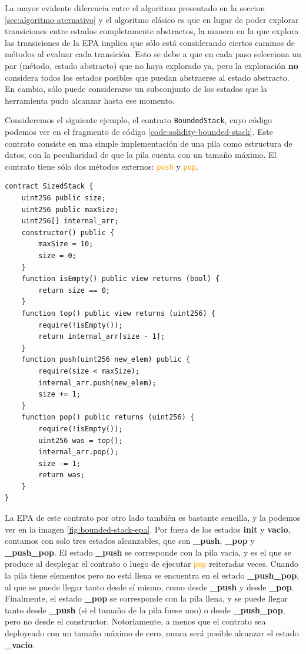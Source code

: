 La mayor evidente diferencia entre el algoritmo presentado en la seccion \ref{sec:algoritmo-aternativo} y el algoritmo clásico es que en lugar de poder explorar transiciones entre estados completamente abstractos, la manera en la que explora las transiciones de la EPA implica que sólo está considerando ciertos caminos de métodos al evaluar cada transición.
Esto se debe a que en cada paso selecciona un par (método, estado abstracto) que no haya explorado ya, pero la exploración \textbf{no} considera todos los estados posibles que puedan abstraerse al estado abstracto.
En cambio, sólo puede considerarse un subconjunto de los estados que la herramienta pudo alcanzar hasta ese momento.

Consideremos el siguiente ejemplo, el contrato \texttt{BoundedStack}, cuyo código podemos ver en el fragmento de código \ref{code:solidity-bounded-stack}.
Este contrato consiste en una simple implementación de una pila como estructura de datos, con la peculiaridad de que la pila cuenta con un tamaño máximo.
El contrato tiene sólo dos métodos externos: \textcolor{orange}{\texttt{push}} y \textcolor{orange}{\texttt{pop}}.
\begin{lstlisting}[language=Solidity, label={code:solidity-bounded-stack}, caption={Contrato Inteligente \texttt{BoundedStack} en Solidity},captionpos=b]
contract SizedStack {
    uint256 public size;
    uint256 public maxSize;
    uint256[] internal_arr;
    constructor() public {
        maxSize = 10;
        size = 0;
    }
    function isEmpty() public view returns (bool) {
        return size == 0;
    }
    function top() public view returns (uint256) {
        require(!isEmpty());
        return internal_arr[size - 1];
    }
    function push(uint256 new_elem) public {
        require(size < maxSize);
        internal_arr.push(new_elem);
        size += 1;
    }
    function pop() public returns (uint256) {
        require(!isEmpty());
        uint256 was = top();
        internal_arr.pop();
        size -= 1;
        return was;
    }
}
\end{lstlisting}
La EPA de este contrato por otro lado también es bastante sencilla, y la podemos ver en la imagen \ref{fig:bounded-stack-epa}.
Por fuera de los estados \textbf{init} y \textbf{vacio}, contamos con solo tres estados alcanzables, que son \textbf{\_push}, \textbf{\_pop} y \textbf{\_push\_pop}.
El estado \textbf{\_push} se corresponde con la pila vacía, y es el que se produce al desplegar el contrato o luego de ejecutar \textcolor{orange}{\texttt{pop}} reiteradas veces.
Cuando la pila tiene elementos pero no está llena se encuentra en el estado \textbf{\_push\_pop}, al que se puede llegar tanto desde sí mismo, como desde \textbf{\_push} y desde \textbf{\_pop}.
Finalmente, el estado \textbf{\_pop} se corresponde con la pila llena, y se puede llegar tanto desde \textbf{\_push} (si el tamaño de la pila fuese uno) o desde \textbf{\_push\_pop}, pero no desde el constructor.
Notoriamente, a menos que el contrato sea deployeado con un tamaño máximo de cero, nunca será posible alcanzar el estado \textbf{\_vacio}.

